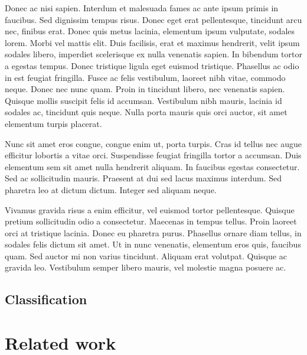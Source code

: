 Donec ac nisi sapien. Interdum et malesuada fames ac ante ipsum primis in faucibus. Sed dignissim tempus risus. Donec eget erat pellentesque, tincidunt arcu nec, finibus erat. Donec quis metus lacinia, elementum ipsum vulputate, sodales lorem. Morbi vel mattis elit. Duis facilisis, erat et maximus hendrerit, velit ipsum sodales libero, imperdiet scelerisque ex nulla venenatis sapien. In bibendum tortor a egestas tempus. Donec tristique ligula eget euismod tristique. Phasellus ac odio in est feugiat fringilla. Fusce ac felis vestibulum, laoreet nibh vitae, commodo neque. Donec nec nunc quam. Proin in tincidunt libero, nec venenatis sapien. Quisque mollis suscipit felis id accumsan. Vestibulum nibh mauris, lacinia id sodales ac, tincidunt quis neque. Nulla porta mauris quis orci auctor, sit amet elementum turpis placerat.

Nunc sit amet eros congue, congue enim ut, porta turpis. Cras id tellus nec augue efficitur lobortis a vitae orci. Suspendisse feugiat fringilla tortor a accumsan. Duis elementum sem sit amet nulla hendrerit aliquam. In faucibus egestas consectetur. Sed ac sollicitudin mauris. Praesent at dui sed lacus maximus interdum. Sed pharetra leo at dictum dictum. Integer sed aliquam neque.

Vivamus gravida risus a enim efficitur, vel euismod tortor pellentesque. Quisque pretium sollicitudin odio a consectetur. Maecenas in tempus tellus. Proin laoreet orci at tristique lacinia. Donec eu pharetra purus. Phasellus ornare diam tellus, in sodales felis dictum sit amet. Ut in nunc venenatis, elementum eros quis, faucibus quam. Sed auctor mi non varius tincidunt. Aliquam erat volutpat. Quisque ac gravida leo. Vestibulum semper libero mauris, vel molestie magna posuere ac.
\subsection{Classification}

\section{Related work}